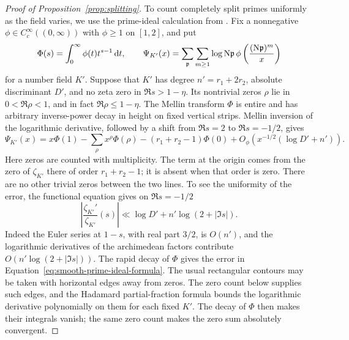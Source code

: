 \begin{proof}[Proof of Proposition~\ref{prop:splitting}]
To count completely split primes uniformly as the field varies, we use
the prime-ideal calculation from
\cite[Section~9, Equations~(9.5)--(9.9)]{PrimitiveRoot2}.  Fix a nonnegative
\(\phi\in C_c^\infty((0,\infty))\) with \(\phi\ge1\) on \([1,2]\), and put
\[
 \Phi(s)=\int_0^\infty\phi(t)t^{s-1}\,\mathrm d t,\qquad
 \Psi_{K'}(x)=\sum_{\mathfrak p}\sum_{m\ge1}
       \log\mathrm N\mathfrak p\,
       \phi\left(\frac{(\mathrm N\mathfrak p)^m}{x}\right)
\]
for a number field \(K'\).  Suppose that \(K'\) has degree
\(n'=r_1+2r_2\), absolute discriminant \(D'\), and no zeta zero in
\(\Re s>1-\eta\).  Its nontrivial zeros \(\rho\) lie in
\(0<\Re\rho<1\), and in fact \(\Re\rho\le1-\eta\).  The Mellin transform
\(\Phi\) is entire and has arbitrary inverse-power decay in height on
fixed vertical strips.  Mellin inversion of the logarithmic derivative,
followed by a shift from \(\Re s=2\) to \(\Re s=-1/2\), gives
\begin{equation}
 \Psi_{K'}(x)=x\Phi(1)-\sum_\rho x^\rho\Phi(\rho)
  -(r_1+r_2-1)\Phi(0)
  +O_\phi\left(x^{-1/2}(\log D'+n')\right).
 \label{eq:smooth-prime-ideal-formula}
\end{equation}
Here zeros are counted with multiplicity.  The term at the origin comes
from the zero of \(\zeta_{K'}\) there of order \(r_1+r_2-1\); it is absent
when that order is zero.  There are no other trivial zeros between the two
lines.  To see the uniformity of the error, the functional equation gives
on \(\Re s=-1/2\)
\[
 \left|\frac{\zeta_{K'}'}{\zeta_{K'}}(s)\right|
 \ll \log D'+n'\log(2+|\Im s|).
\]
Indeed the Euler series at \(1-s\), with real part \(3/2\), is \(O(n')\),
and the logarithmic derivatives of the archimedean factors contribute
\(O(n'\log(2+|\Im s|))\).  The rapid decay of \(\Phi\) gives the error in
Equation~\eqref{eq:smooth-prime-ideal-formula}.  The usual rectangular
contours may be taken with horizontal edges away from zeros.  The zero count
below supplies such edges, and the Hadamard partial-fraction formula bounds
the logarithmic derivative polynomially on them for each fixed \(K'\).
The decay of \(\Phi\) then makes their integrals vanish; the same zero count
makes the zero sum absolutely convergent.


\end{proof}
